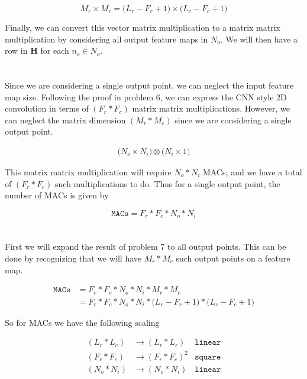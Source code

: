 \documentclass[12pt]{article}
\begin{document}
\begin{equation}
	M_r \times M_c = \big(L_r - F_r + 1\big) \times \big(L_c - F_c + 1 \big)
\end{equation}

Finally, we can convert this vector matrix multiplication to a matrix matrix
multiplication by considering all output feature maps in $N_o$. We will then
have a row in $\boldsymbol{H}$ for each $n_o \in N_o$.

\section{}

Since we are considering a single output point, we can neglect the input
feature map size. Following the proof in problem 6, we can express the CNN
style 2D convolution in terms of $(F_r * F_c)$ matrix matrix multiplications.
However, we can neglect the matrix dimension $(M_r * M_c)$ since we are
considering a single output point.

\begin{align}
	\bigg(N_o \times N_i\bigg) \otimes \bigg(N_i \times 1 \bigg)
\end{align}

This matrix matrix multiplication will require $N_o * N_i$ MACs, and we have a
total of $(F_r * F_c)$ such multiplications to do. Thus for a single output
point, the number of MACs is given by

\begin{equation}
	\texttt{MACs} = F_r * F_c * N_o * N_i
\end{equation}

\section{}

First we will expand the result of problem 7 to all output points. This can be
done by recognizing that we will have $M_r * M_c$ such output points on a
feature map.

\begin{align}
	\texttt{MACs} &= F_r * F_c * N_o * N_i * M_r * M_c \\
	&= F_r * F_c * N_o * N_i * \big(L_r - F_r + 1\big) * \big(L_c - F_c + 1\big)
\end{align}

So for MACs we have the following scaling

\begin{align}
	(L_r * L_c) &\rightarrow (L_r * L_c) &\texttt{linear}  \\
	(F_r * F_c) &\rightarrow (F_r * F_c)^2 &\texttt{square} \\
	(N_o * N_i) &\rightarrow (N_o * N_i) &\texttt{linear}
\end{align}
\end{document}
